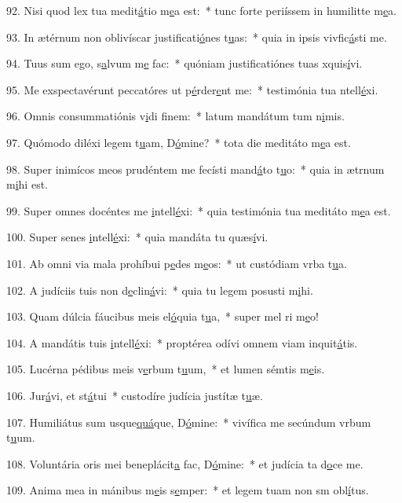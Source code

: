 92. Nisi quod lex tua medit\uline{á}tio m\uline{e}a est:~* tunc forte periíssem in humilitte m\uline{e}a.\par 
93. In ætérnum non oblivíscar justificati\uline{ó}nes t\uline{u}as:~* quia in ipsis vivfic\uline{á}sti me.\par 
94. Tuus sum ego, s\uline{a}lvum m\uline{e} fac:~* quóniam justificatiónes tuas xquis\uline{í}vi.\par 
95. Me exspectavérunt peccatóres ut p\uline{é}rder\uline{e}nt me:~* testimónia tua ntell\uline{é}xi.\par 
96. Omnis consummatiónis v\uline{i}di f\uline{i}nem:~* latum mandátum tum n\uline{i}mis.\par 
97. Quómodo diléxi legem t\uline{u}am, D\uline{ó}mine?~* tota die meditáto m\uline{e}a est.\par 
98. Super inimícos meos prudéntem me fecísti mand\uline{á}to t\uline{u}o:~* quia in ætrnum m\uline{i}hi est.\par 
99. Super omnes docéntes me \uline{i}ntell\uline{é}xi:~* quia testimónia tua meditáto m\uline{e}a est.\par 
100. Super senes \uline{i}ntell\uline{é}xi:~* quia mandáta tu quæs\uline{í}vi.\par 
101. Ab omni via mala prohíbui p\uline{e}des m\uline{e}os:~* ut custódiam vrba t\uline{u}a.\par 
102. A judíciis tuis non d\uline{e}clin\uline{á}vi:~* quia tu legem posusti m\uline{i}hi.\par 
103. Quam dúlcia fáucibus meis el\uline{ó}quia t\uline{u}a,~* super mel ri m\uline{e}o!\par 
104. A mandátis tuis \uline{i}ntell\uline{é}xi:~* proptérea odívi omnem viam inquit\uline{á}tis.\par 
105. Lucérna pédibus meis v\uline{e}rbum t\uline{u}um,~* et lumen sémtis m\uline{e}is.\par 
106. Jur\uline{á}vi, et st\uline{á}tui~* custodíre judícia justítæ t\uline{u}æ.\par 
107. Humiliátus sum usque\uline{quá}que, D\uline{ó}mine:~* vivífica me secúndum vrbum t\uline{u}um.\par 
108. Voluntária oris mei beneplácit\uline{a} fac, D\uline{ó}mine:~* et judícia ta d\uline{o}ce me.\par 
109. Anima mea in mánibus m\uline{e}is s\uline{e}mper:~* et legem tuam non sm obl\uline{í}tus.\par 
